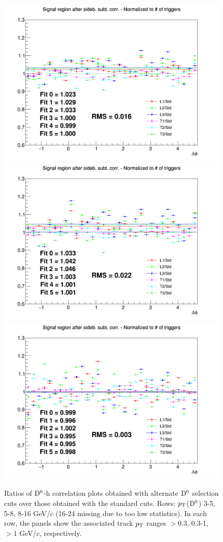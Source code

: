 \begin{figure}
{\includegraphics[width=0.31\linewidth]{figuresVsCent/Dzero/SystDcuts/60_100/Ratio_AzimCorrDistr_Dzero_Canvas_PtIntBins9to11_PoolInt_thr03to99.png}}
{\includegraphics[width=0.31\linewidth]{figuresVsCent/Dzero/SystDcuts/60_100/Ratio_AzimCorrDistr_Dzero_Canvas_PtIntBins9to11_PoolInt_thr03to1.png}}
{\includegraphics[width=0.31\linewidth]{figuresVsCent/Dzero/SystDcuts/60_100/Ratio_AzimCorrDistr_Dzero_Canvas_PtIntBins9to11_PoolInt_thr1to99.png}} \\
 \caption{Ratios of ${\rm D^0}$-h correlation plots obtained with alternate ${\rm D^0}$ selection cuts over those obtained with the standard cuts. Rows: $p_{\rm T}$(${\rm D^0}$) 3-5, 5-8, 8-16 GeV/$c$ (16-24 missing due to too low statistics). In each row, the panels show the associated track
$p_{\rm T}$ ranges $> 0.3$, 0.3-1, $> 1$ GeV/$c$, respectively.}
\label{fig:SysDcut60100}
\end{figure}

